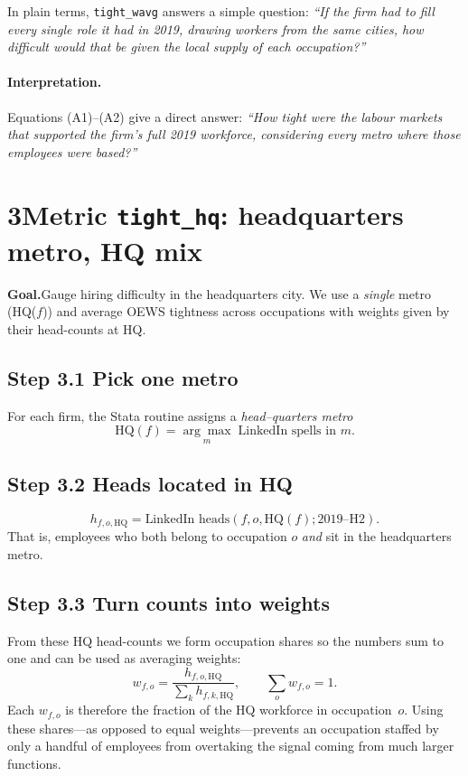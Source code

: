 \documentclass[11pt]{article}
\begin{document}
In plain terms, \texttt{tight\_wavg} answers a simple question: 
\emph{“If the firm had to fill every single role it had in 2019, drawing
workers from the same cities, how difficult would that be given the
local supply of each occupation?”}

\paragraph{Interpretation.}  Equations (A1)--(A2) give a direct answer:
\emph{“How tight were the labour markets that supported the firm’s full
2019 workforce, considering every metro where those employees were
based?”}

\section*{3\quad Metric \texttt{tight\_hq}: headquarters metro, HQ mix}


\textbf{Goal.}\;Gauge hiring difficulty in the headquarters city.  We use a
\emph{single} metro (HQ($f$)) and average OEWS tightness across
occupations with weights given by their head-counts at HQ.

\subsection*{Step 3.1\; Pick one metro}
For each firm, the Stata routine assigns a \emph{head--quarters metro}
\[\text{HQ}(f)=\underset{m}{\arg\max}\;\text{LinkedIn spells in }m.\]

\subsection*{Step 3.2\; Heads located in HQ}\vspace{-0.3em}
\[
  h_{f,o,\text{HQ}} = \text{LinkedIn heads}(f, o, \text{HQ}(f); 2019\text{--H2}).
\]
That is, employees who both belong to occupation $o$ \emph{and} sit in
the headquarters metro.

\subsection*{Step 3.3\; Turn counts into weights}
From these HQ head-counts we form occupation shares so the numbers sum to
one and can be used as averaging weights:
\[
  w_{f,o}=\frac{h_{f,o,\text{HQ}}}{\sum_k h_{f,k,\text{HQ}}}, \qquad \textstyle\sum_o w_{f,o}=1.
\]
Each $w_{f,o}$ is therefore the fraction of the HQ workforce in
occupation~$o$.  Using these shares—as opposed to equal weights—prevents
an occupation staffed by only a handful of employees from overtaking the
signal coming from much larger functions.
\end{document}
